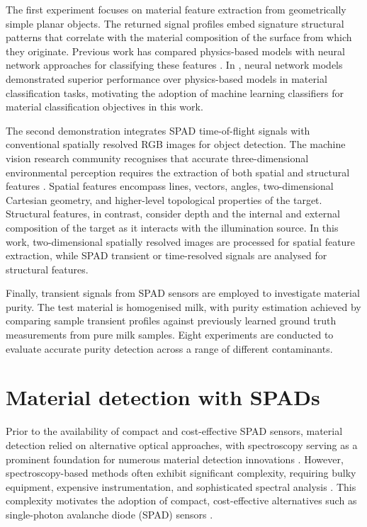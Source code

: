\documentclass[12pt,a4paper,oneside]{report}
\let\oldsection\section
\renewcommand{\section}{\clearpage\oldsection}
\begin{document}
The first experiment focuses on material feature extraction from geometrically simple planar objects. The returned signal profiles embed signature structural patterns that correlate with the material composition of the surface from which they originate. Previous work has compared physics-based models with neural network approaches for classifying these features \cite{su2016}. In \cite{su2016}, neural network models demonstrated superior performance over physics-based models in material classification tasks, motivating the adoption of machine learning classifiers for material classification objectives in this work.

The second demonstration integrates SPAD time-of-flight signals with conventional spatially resolved RGB images for object detection. The machine vision research community recognises that accurate three-dimensional environmental perception requires the extraction of both spatial and structural features \cite{chen2024}. Spatial features encompass lines, vectors, angles, two-dimensional Cartesian geometry, and higher-level topological properties of the target. Structural features, in contrast, consider depth and the internal and external composition of the target as it interacts with the illumination source. In this work, two-dimensional spatially resolved images are processed for spatial feature extraction, while SPAD transient or time-resolved signals are analysed for structural features.

Finally, transient signals from SPAD sensors are employed to investigate material purity. The test material is homogenised milk, with purity estimation achieved by comparing sample transient profiles against previously learned ground truth measurements from pure milk samples. Eight experiments are conducted to evaluate accurate purity detection across a range of different contaminants.

\newpage
\section{Material detection with SPADs}
\label{sec:material_detection_spads}

Prior to the availability of compact and cost-effective SPAD sensors, material detection relied on alternative optical approaches, with spectroscopy serving as a prominent foundation for numerous material detection innovations \cite{holt2016}. However, spectroscopy-based methods often exhibit significant complexity, requiring bulky equipment, expensive instrumentation, and sophisticated spectral analysis \cite{holt2016}. This complexity motivates the adoption of compact, cost-effective alternatives such as single-photon avalanche diode (SPAD) sensors \cite{piron2020}.
\end{document}
